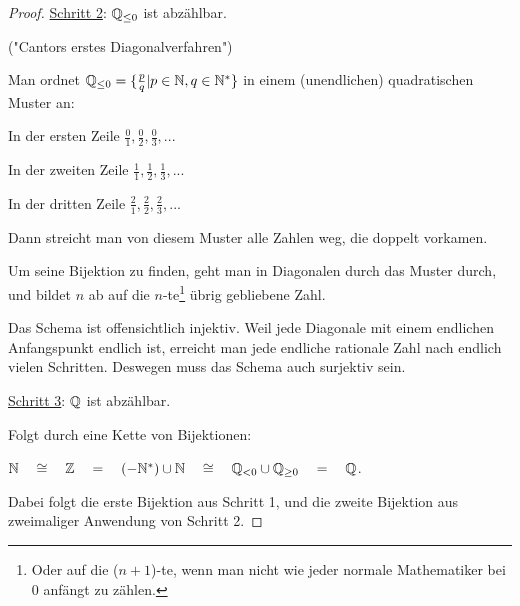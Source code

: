 \begin{proof}
    \underline{Schritt 2}: $\mathbb{Q}_{\leq 0}$ ist abzählbar.

    ("Cantors erstes Diagonalverfahren")

    Man ordnet $\mathbb{Q}_{\leq 0} = \{ \frac{p}{q} | p \in \mathbb{N}, q \in \mathbb{N}^* \}$ in einem (unendlichen) quadratischen Muster an:

    In der ersten Zeile $\frac{0}{1}, \frac{0}{2}, \frac{0}{3}, ...$

    In der zweiten Zeile $\frac{1}{1}, \frac{1}{2}, \frac{1}{3}, ...$

    In der dritten Zeile $\frac{2}{1}, \frac{2}{2}, \frac{2}{3}, ...$

    Dann streicht man von diesem Muster alle Zahlen weg, die doppelt vorkamen.

    Um seine Bijektion zu finden, geht man in Diagonalen durch das Muster durch, und bildet $n$ ab auf die $n$-te\footnote{Oder auf die ($n+1$)-te, wenn man nicht wie jeder normale Mathematiker bei $0$ anfängt zu zählen.} übrig gebliebene Zahl.

    Das Schema ist offensichtlich injektiv. Weil jede Diagonale mit einem endlichen Anfangspunkt endlich ist, erreicht man jede endliche rationale Zahl nach endlich vielen Schritten. Deswegen muss das Schema auch surjektiv sein.

    \underline{Schritt 3}: $\mathbb{Q}$ ist abzählbar.

    Folgt durch eine Kette von Bijektionen:
    
    $\mathbb{N} \quad \cong \quad \mathbb{Z} \quad = \quad (-\mathbb{N}^*) \cup \mathbb{N} \quad \cong \quad \mathbb{Q}_{< 0} \cup \mathbb{Q}_{\geq 0} \quad = \quad \mathbb{Q}$.

    Dabei folgt die erste Bijektion aus Schritt 1, und die zweite Bijektion aus zweimaliger Anwendung von Schritt 2.
\end{proof}


